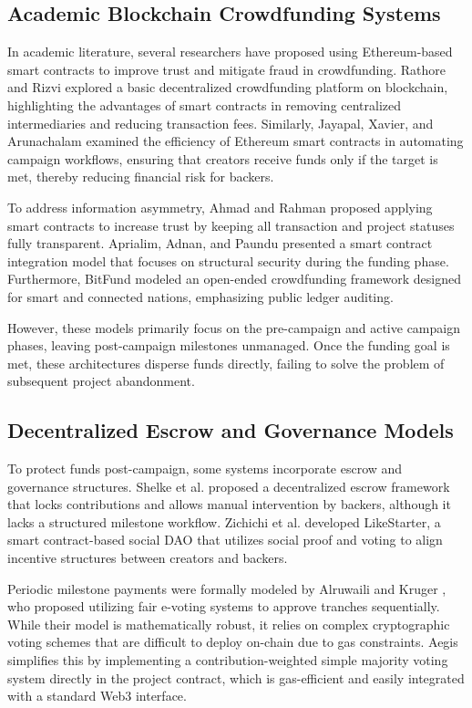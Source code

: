 \documentclass[conference]{IEEEtran}
\begin{document}
\subsection{Academic Blockchain Crowdfunding Systems}
In academic literature, several researchers have proposed using Ethereum-based smart contracts to improve trust and mitigate fraud in crowdfunding. Rathore and Rizvi \cite{rathore2023decentralized} explored a basic decentralized crowdfunding platform on blockchain, highlighting the advantages of smart contracts in removing centralized intermediaries and reducing transaction fees. Similarly, Jayapal, Xavier, and Arunachalam \cite{jayapal2023capitalizing} examined the efficiency of Ethereum smart contracts in automating campaign workflows, ensuring that creators receive funds only if the target is met, thereby reducing financial risk for backers.

To address information asymmetry, Ahmad and Rahman \cite{ahmad2021applying} proposed applying smart contracts to increase trust by keeping all transaction and project statuses fully transparent. Aprialim, Adnan, and Paundu \cite{aprialim2021penerapan} presented a smart contract integration model that focuses on structural security during the funding phase. Furthermore, BitFund \cite{bitfund2020} modeled an open-ended crowdfunding framework designed for smart and connected nations, emphasizing public ledger auditing. 

However, these models primarily focus on the pre-campaign and active campaign phases, leaving post-campaign milestones unmanaged. Once the funding goal is met, these architectures disperse funds directly, failing to solve the problem of subsequent project abandonment.

\subsection{Decentralized Escrow and Governance Models}
To protect funds post-campaign, some systems incorporate escrow and governance structures. Shelke et al. \cite{shelke2022blockchain} proposed a decentralized escrow framework that locks contributions and allows manual intervention by backers, although it lacks a structured milestone workflow. Zichichi et al. \cite{zichichi2019likestarter} developed LikeStarter, a smart contract-based social DAO that utilizes social proof and voting to align incentive structures between creators and backers. 

Periodic milestone payments were formally modeled by Alruwaili and Kruger \cite{alruwaili2020milestone}, who proposed utilizing fair e-voting systems to approve tranches sequentially. While their model is mathematically robust, it relies on complex cryptographic voting schemes that are difficult to deploy on-chain due to gas constraints. Aegis simplifies this by implementing a contribution-weighted simple majority voting system directly in the project contract, which is gas-efficient and easily integrated with a standard Web3 interface. 
\end{document}
